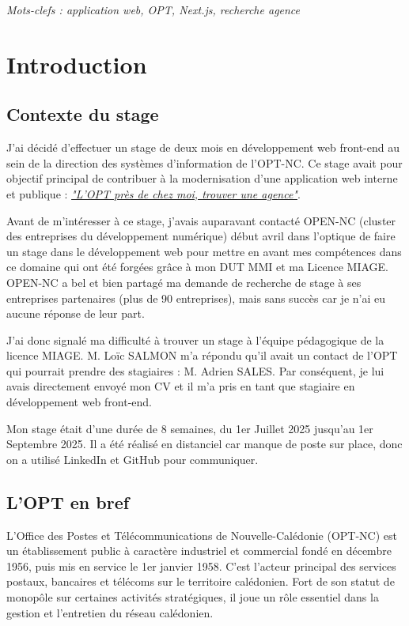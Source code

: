 \documentclass[12pt,a4paper]{report}
\begin{document}
\vspace{1cm}
\textit{Mots-clefs : application web, OPT, Next.js, recherche agence}

\newpage

\tableofcontents
\newpage

\chapter{Introduction}
\section{Contexte du stage}
J'ai décidé d'effectuer un stage de deux mois en développement web front-end au sein de la direction des systèmes d’information de l’OPT-NC. Ce stage avait pour objectif principal de contribuer à la modernisation d’une application web interne et publique : \textit{\href{https://www.opt.nc/service/l-opt-pres-de-chez-moi-trouver-une-agence}{"L'OPT près de chez moi, trouver une agence"}}.

\vspace{1cm}
Avant de m'intéresser à ce stage, j'avais auparavant contacté OPEN-NC (cluster des entreprises du développement numérique) début avril dans l'optique de faire un stage dans le développement web pour mettre en avant mes compétences dans ce domaine qui ont été forgées grâce à mon DUT MMI et ma Licence MIAGE. OPEN-NC a bel et bien partagé ma demande de recherche de stage à ses entreprises partenaires (plus de 90 entreprises), mais sans succès car je n'ai eu aucune réponse de leur part.

\vspace{1cm}
J'ai donc signalé ma difficulté à trouver un stage à l'équipe pédagogique de la licence MIAGE. M. Loïc SALMON m'a répondu qu'il avait un contact de l'OPT qui pourrait prendre des stagiaires : M. Adrien SALES. Par conséquent, je lui avais directement envoyé mon CV et il m'a pris en tant que stagiaire en développement web front-end.

\vspace{1cm}
Mon stage était d'une durée de 8 semaines, du 1er Juillet 2025 jusqu'au 1er Septembre 2025. Il a été réalisé en distanciel car manque de poste sur place, donc on a utilisé LinkedIn et GitHub pour communiquer.


\section{L'OPT en bref}
\cite{blog_opt} L’Office des Postes et Télécommunications de Nouvelle-Calédonie (OPT-NC) est un établissement public à caractère industriel et commercial fondé en décembre 1956, puis mis en service le 1er janvier 1958. C'est l’acteur principal des services postaux, bancaires et télécoms sur le territoire calédonien. Fort de son statut de monopôle sur certaines activités stratégiques, il joue un rôle essentiel dans la gestion et l'entretien du réseau calédonien.
\end{document}
